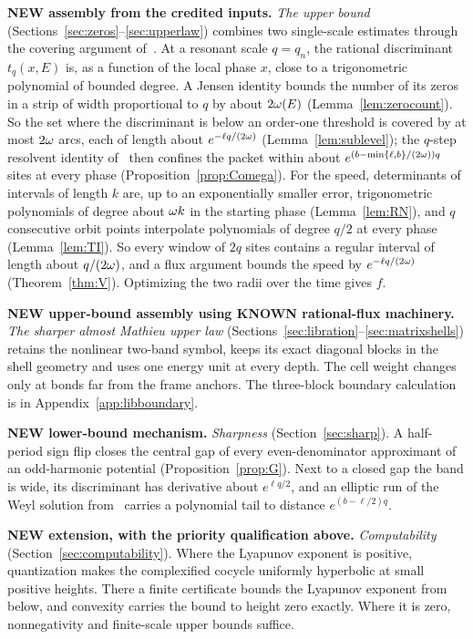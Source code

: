 \textbf{NEW assembly from the credited inputs.} \emph{The upper bound} (Sections~\ref{sec:zeros}--\ref{sec:upperlaw}) combines two single-scale estimates through the covering argument of~\cite{DMamo,DMuniv}. At a resonant scale $q=q_n$, the rational discriminant $t_q(x,E)$ is, as a function of the local phase $x$, close to a trigonometric polynomial of bounded degree. A Jensen identity bounds the number of its zeros in a strip of width proportional to $q$ by about $2\omega(E)$ (Lemma~\ref{lem:zerocount}). So the set where the discriminant is below an order-one threshold is covered by at most $2\omega$ arcs, each of length about $e^{-\ell q/(2\omega)}$ (Lemma~\ref{lem:sublevel}); the $q$-step resolvent identity of~\cite{DMuniv} then confines the packet within about $e^{(b-\min\{\ell,b\}/(2\omega))q}$ sites at every phase (Proposition~\ref{prop:Comega}). For the speed, determinants of intervals of length $k$ are, up to an exponentially smaller error, trigonometric polynomials of degree about $\omega k$ in the starting phase (Lemma~\ref{lem:RN}), and $q$ consecutive orbit points interpolate polynomials of degree $q/2$ at every phase (Lemma~\ref{lem:TI}). So every window of $2q$ sites contains a regular interval of length about $q/(2\omega)$, and a flux argument bounds the speed by $e^{-\ell q/(2\omega)}$ (Theorem~\ref{thm:V}). Optimizing the two radii over the time gives $f$.

\textbf{NEW upper-bound assembly using KNOWN rational-flux machinery.} \emph{The sharper almost Mathieu upper law} (Sections~\ref{sec:libration}--\ref{sec:matrixshells}) retains the nonlinear two-band symbol, keeps its exact diagonal blocks in the shell geometry and uses one energy unit at every depth. The cell weight changes only at bonds far from the frame anchors. The three-block boundary calculation is in Appendix~\ref{app:libboundary}.

\textbf{NEW lower-bound mechanism.} \emph{Sharpness} (Section~\ref{sec:sharp}). A half-period sign flip closes the central gap of every even-denominator approximant of an odd-harmonic potential (Proposition~\ref{prop:G}). Next to a closed gap the band is wide, its discriminant has derivative about $e^{\ell q/2}$, and an elliptic run of the Weyl solution from~\cite{DMamo} carries a polynomial tail to distance $e^{(b-\ell/2)q}$.

\textbf{NEW extension, with the priority qualification above.} \emph{Computability} (Section~\ref{sec:computability}). Where the Lyapunov exponent is positive, quantization makes the complexified cocycle uniformly hyperbolic at small positive heights. There a finite certificate bounds the Lyapunov exponent from below, and convexity carries the bound to height zero exactly. Where it is zero, nonnegativity and finite-scale upper bounds suffice.


